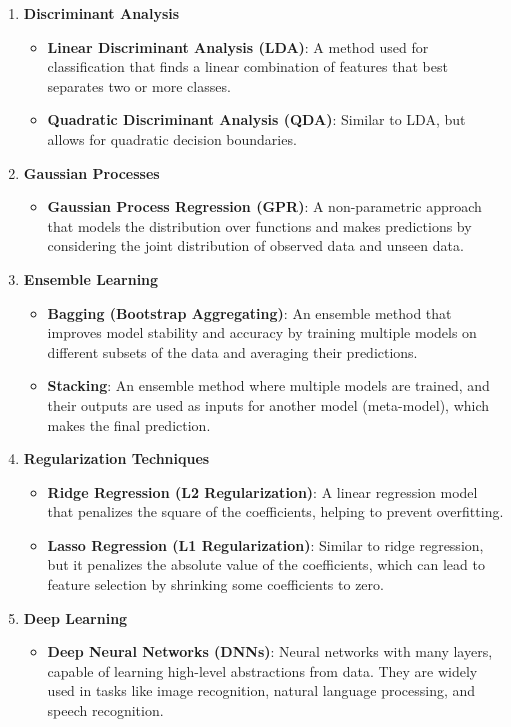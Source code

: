 \begin{enumerate}
    \item \textbf{Discriminant Analysis}
    \begin{itemize}
        \item \textbf{Linear Discriminant Analysis (LDA)}: A method used for classification that finds a linear combination of features that best separates two or more classes.
        \item \textbf{Quadratic Discriminant Analysis (QDA)}: Similar to LDA, but allows for quadratic decision boundaries.
    \end{itemize}

    \item \textbf{Gaussian Processes}
    \begin{itemize}
        \item \textbf{Gaussian Process Regression (GPR)}: A non-parametric approach that models the distribution over functions and makes predictions by considering the joint distribution of observed data and unseen data.
    \end{itemize}

    \item \textbf{Ensemble Learning}
    \begin{itemize}
        \item \textbf{Bagging (Bootstrap Aggregating)}: An ensemble method that improves model stability and accuracy by training multiple models on different subsets of the data and averaging their predictions.
        \item \textbf{Stacking}: An ensemble method where multiple models are trained, and their outputs are used as inputs for another model (meta-model), which makes the final prediction.
    \end{itemize}

    \item \textbf{Regularization Techniques}
    \begin{itemize}
        \item \textbf{Ridge Regression (L2 Regularization)}: A linear regression model that penalizes the square of the coefficients, helping to prevent overfitting.
        \item \textbf{Lasso Regression (L1 Regularization)}: Similar to ridge regression, but it penalizes the absolute value of the coefficients, which can lead to feature selection by shrinking some coefficients to zero.
    \end{itemize}

    \item \textbf{Deep Learning}
    \begin{itemize}
        \item \textbf{Deep Neural Networks (DNNs)}: Neural networks with many layers, capable of learning high-level abstractions from data. They are widely used in tasks like image recognition, natural language processing, and speech recognition.
    \end{itemize}
\end{enumerate}

